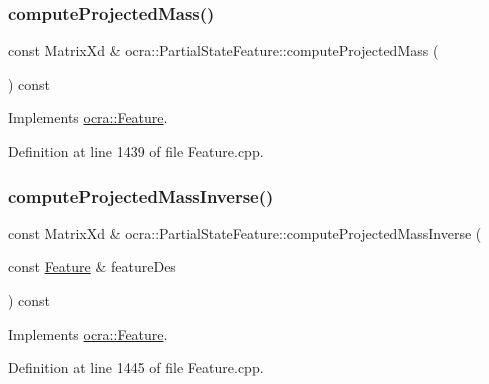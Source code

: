 \subsubsection{\texorpdfstring{compute\+Projected\+Mass()}{computeProjectedMass()}\hspace{0.1cm}{\footnotesize\ttfamily [2/2]}}
{\footnotesize\ttfamily const Matrix\+Xd \& ocra\+::\+Partial\+State\+Feature\+::compute\+Projected\+Mass (\begin{DoxyParamCaption}{ }\end{DoxyParamCaption}) const\hspace{0.3cm}{\ttfamily [virtual]}}



Implements \hyperlink{classocra_1_1Feature_a99ac023809c0cf34b5d582537934b08c}{ocra\+::\+Feature}.



Definition at line 1439 of file Feature.\+cpp.

\hypertarget{classocra_1_1PartialStateFeature_acebec8dd4cadc55641a9286fb3685674}{}\label{classocra_1_1PartialStateFeature_acebec8dd4cadc55641a9286fb3685674} 
\subsubsection{\texorpdfstring{compute\+Projected\+Mass\+Inverse()}{computeProjectedMassInverse()}\hspace{0.1cm}{\footnotesize\ttfamily [1/2]}}
{\footnotesize\ttfamily const Matrix\+Xd \& ocra\+::\+Partial\+State\+Feature\+::compute\+Projected\+Mass\+Inverse (\begin{DoxyParamCaption}\item[{const \hyperlink{classocra_1_1Feature}{Feature} \&}]{feature\+Des }\end{DoxyParamCaption}) const\hspace{0.3cm}{\ttfamily [virtual]}}



Implements \hyperlink{classocra_1_1Feature_ac529096b3fe8eba1ab88a56d8b042d37}{ocra\+::\+Feature}.



Definition at line 1445 of file Feature.\+cpp.

\hypertarget{classocra_1_1PartialStateFeature_a1e1a569e8472551e91845e585c30c4ca}{}\label{classocra_1_1PartialStateFeature_a1e1a569e8472551e91845e585c30c4ca} 
